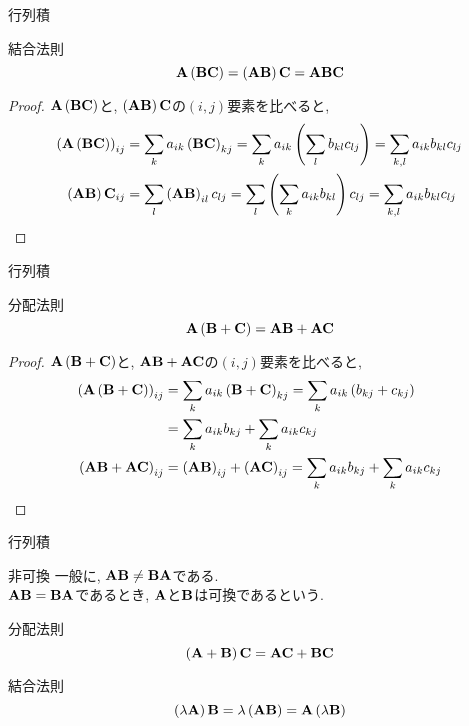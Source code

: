 \documentclass[dvipdfmx,notheorems,t]{beamer}
\begin{document}
\begin{frame}{行列積}
\begin{block}{結合法則}
  $$\vb{A} \left( \vb{B} \vb{C} \right) = \left( \vb{A} \vb{B} \right) \vb{C}
    = \vb{A} \vb{B} \vb{C}$$
\end{block}

\begin{proof}
  $\vb{A} \left( \vb{B} \vb{C} \right)$と, $\left( \vb{A} \vb{B} \right) \vb{C}$の$(i, j)$要素を比べると,
  \begin{align*}
    \left(\vb{A} \left( \vb{B} \vb{C} \right)\right)_{ij}
      &= \sum_k a_{ik} \left( \vb{B} \vb{C} \right)_{kj}
      = \sum_k a_{ik} \left( \sum_l b_{kl} c_{lj} \right)
      = \sum_{k, l} a_{ik} b_{kl} c_{lj} \\
    \left( \vb{A} \vb{B} \right) \vb{C}_{ij}
      &= \sum_l \left( \vb{A} \vb{B} \right)_{il} c_{lj}
      = \sum_l \left( \sum_k a_{ik} b_{kl} \right) c_{lj}
      = \sum_{k, l} a_{ik} b_{kl} c_{lj}
  \end{align*}
\end{proof}
\end{frame}

\begin{frame}{行列積}
\begin{block}{分配法則}
  $$\vb{A} \left( \vb{B} + \vb{C} \right) = \vb{A} \vb{B} + \vb{A} \vb{C}$$
\end{block}

\begin{proof}
  $\vb{A} \left( \vb{B} + \vb{C} \right)$と, $\vb{A} \vb{B} + \vb{A} \vb{C}$の$(i, j)$要素を比べると,
  \begin{align*}
    \left( \vb{A} \left( \vb{B} + \vb{C} \right) \right)_{ij}
      &= \sum_k a_{ik} \left( \vb{B} + \vb{C} \right)_{kj}
      = \sum_k a_{ik} \left( b_{kj} + c_{kj} \right) \\
      &= \sum_k a_{ik} b_{kj} + \sum_k a_{ik} c_{kj} \\
    \left( \vb{A} \vb{B} + \vb{A} \vb{C} \right)_{ij}
      &= \left( \vb{A} \vb{B} \right)_{ij} + \left( \vb{A} \vb{C} \right)_{ij}
      = \sum_k a_{ik} b_{kj} + \sum_k a_{ik} c_{kj}
  \end{align*}
\end{proof}
\end{frame}

\begin{frame}{行列積}
\begin{block}{非可換}
  一般に, $\vb{A} \vb{B} \neq \vb{B} \vb{A}$である. \\
  $\vb{A} \vb{B} = \vb{B} \vb{A}$であるとき, $\vb{A}$と$\vb{B}$は可換であるという.
\end{block}

\begin{block}{分配法則}
  $$\left( \vb{A} + \vb{B} \right) \vb{C} = \vb{A} \vb{C} + \vb{B} \vb{C}$$
\end{block}

\begin{block}{結合法則}
  $$\left( \lambda \vb{A} \right) \vb{B} = \lambda \left( \vb{A} \vb{B} \right)
    = \vb{A} \left( \lambda \vb{B} \right)$$
\end{block}
\end{frame}
\end{document}
